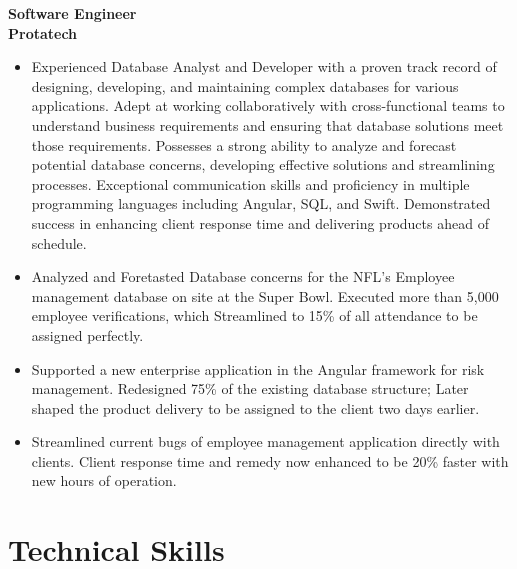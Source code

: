 \documentclass[11pt, letterpaper]{article}
\newcommand{\position}[3]{
  \textbf{#1} \hfill \textit{#2} \\
  #3 \vspace{6pt}
}
\begin{document}
\position{Software Engineer}{}{
  \textbf{Protatech}
  \begin{itemize}[leftmargin=20pt, itemsep=2pt]
    \item Experienced Database Analyst and Developer with a proven track record of designing, developing, and maintaining complex databases for various applications. Adept at working collaboratively with cross-functional teams to understand business requirements and ensuring that database solutions meet those requirements. Possesses a strong ability to analyze and forecast potential database concerns, developing effective solutions and streamlining processes. Exceptional communication skills and proficiency in multiple programming languages including Angular, SQL, and Swift. Demonstrated success in enhancing client response time and delivering products ahead of schedule.
    \item Analyzed and Foretasted Database concerns for the NFL’s Employee management database on site at the Super Bowl. Executed more than 5,000 employee verifications, which Streamlined to 15\% of all attendance to be assigned perfectly.
    \item Supported a new enterprise application in the Angular framework for risk management. Redesigned 75\% of the existing database structure; Later shaped the product delivery to be assigned to the client two days earlier.
    \item Streamlined current bugs of employee management application directly with clients. Client response time and remedy now enhanced to be 20\% faster with new hours of operation.
  \end{itemize}
}

\section{Technical Skills}
\end{document}
